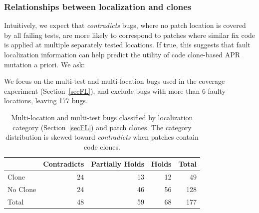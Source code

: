 \documentclass[10pt,journal,compsoc]{IEEEtran}
\begin{document}
\subsubsection{Relationships between localization and clones}
Intuitively, we expect that \emph{contradicts} bugs, where no patch location is 
covered by all failing tests, are more likely to correspond to patches where
similar fix code is applied at multiple separately tested locations. If 
true, this suggests that fault localization information can help 
predict the utility of code clone-based APR mutation a priori. We ask:


%
We focus on the multi-test and multi-location bugs used in the coverage 
experiment (Section~\ref{secFL}), and exclude bugs with more than 6 faulty locations, leaving 177 bugs.

\begin{table}
  {\begin{center}
      \begin{tabular} {lrrrr}
        \toprule
        & Contradicts & Partially Holds & Holds & Total \\
        \midrule
        Clone & 24 & 13 & 12 &  49 \\
        No Clone  & 24 & 46 & 56 & 128 \\
        \midrule
        Total     & 48 & 59 & 68 & 177 \\
        \bottomrule
      \end{tabular}
    \end{center}
  }

  \caption{\small Multi-location and multi-test bugs classified by localization
    category (Section~\ref{secFL}) and patch clones. The category distribution
    is skewed toward \emph{contradicts} when patches contain code clones.}
  \label{tab:cov_clones}
\end{table}
\end{document}
